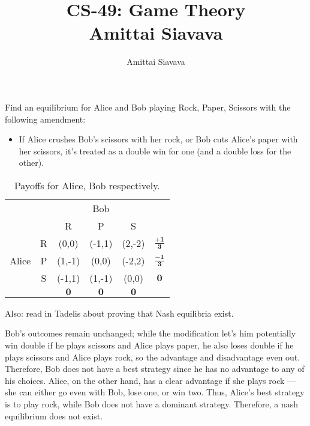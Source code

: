 \documentclass[11pt, reqno]{amsart}
\begin{document}

\title{CS-49: Game Theory\\ Amittai Siavava \\ }
\author{Amittai Siavava}


\setlength{\headheight}{13.0pt}
\setlength{\footskip}{15.0pt}

\maketitle

\bigskip

\def \cram { \textsc{cram} }
\def \dom { \textsc{domineering} }
\def \sub { \textsc{subtraction} }
\def \weighted { \textsc{weighted odds and evens}}
\def \nim { \textsc{nim} }
\def \P { \mathbf{P}}
\def \N { \mathbf{N}}

\newpage
\begin{problem}[14]
  Find an equilibrium for Alice and Bob playing Rock, Paper, Scissors with the following amendment:
  
  \begin{itemize}
    \item If Alice crushes Bob's scissors with her rock, or Bob cuts Alice's paper with her scissors,
    it's treated as a double win for one (and a double loss for the other).
  \end{itemize}
  \begin{table}[h]
    \centering
    \begin{tabular}{c c | c c c | c }
       & & \multicolumn{3}{c|}{Bob} \\
      & & R & P & S \\
      \midrule
      \multirow{3}{*}{Alice} & R & (0,0) & (-1,1) & (2,-2) & $\mathbf{\frac{+1}{3}}$ \\
      & P & (1,-1) & (0,0) & (-2,2) & $\mathbf{\frac{-1}{3}}$ \\
      & S & (-1,1) & (1,-1) & (0,0) & $\mathbf{0}$\\
      \midrule
      & & $\mathbf{0}$ & $\mathbf{0}$ & $\mathbf{0}$ & \\
    \end{tabular}
    \caption{Payoffs for Alice, Bob respectively.}
  \end{table}
  Also: read in Tadelis about proving that Nash equilibria exist.

  Bob's outcomes remain unchanged; while the modification let's him potentially
  win double if he plays scissors and Alice plays paper,
  he also loses double if he plays scissors and Alice plays rock,
  so the advantage and disadvantage even out.
  Therefore, Bob does not have a best strategy since he has no advantage to any of his choices.
  Alice, on the other hand, has a clear advantage if she plays rock ---
  she can either go even with Bob, lose one, or win two.
  Thus, Alice's best strategy is to play rock, while Bob does not have a dominant strategy.
  Therefore, a nash equilibrium does not exist.

\end{problem}
\end{document}
